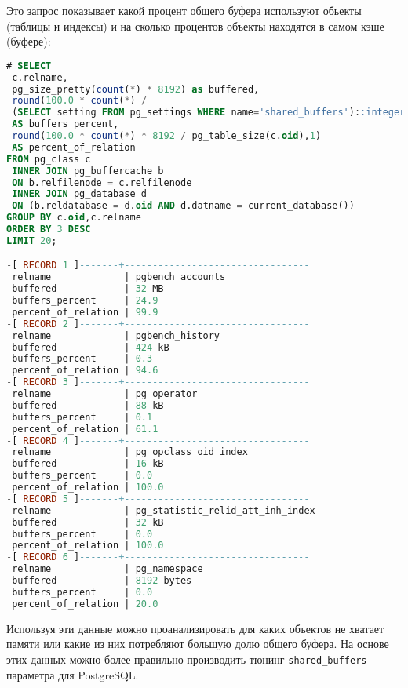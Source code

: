 Это запрос показывает какой процент общего буфера используют обьекты (таблицы и индексы) и на сколько процентов объекты находятся в самом кэше (буфере):

\begin{lstlisting}[language=SQL,label=lst:pgbuffercache4,caption=pg\_buffercache]
# SELECT
 c.relname,
 pg_size_pretty(count(*) * 8192) as buffered,
 round(100.0 * count(*) /
 (SELECT setting FROM pg_settings WHERE name='shared_buffers')::integer,1)
 AS buffers_percent,
 round(100.0 * count(*) * 8192 / pg_table_size(c.oid),1)
 AS percent_of_relation
FROM pg_class c
 INNER JOIN pg_buffercache b
 ON b.relfilenode = c.relfilenode
 INNER JOIN pg_database d
 ON (b.reldatabase = d.oid AND d.datname = current_database())
GROUP BY c.oid,c.relname
ORDER BY 3 DESC
LIMIT 20;

-[ RECORD 1 ]-------+---------------------------------
 relname             | pgbench_accounts
 buffered            | 32 MB
 buffers_percent     | 24.9
 percent_of_relation | 99.9
-[ RECORD 2 ]-------+---------------------------------
 relname             | pgbench_history
 buffered            | 424 kB
 buffers_percent     | 0.3
 percent_of_relation | 94.6
-[ RECORD 3 ]-------+---------------------------------
 relname             | pg_operator
 buffered            | 88 kB
 buffers_percent     | 0.1
 percent_of_relation | 61.1
-[ RECORD 4 ]-------+---------------------------------
 relname             | pg_opclass_oid_index
 buffered            | 16 kB
 buffers_percent     | 0.0
 percent_of_relation | 100.0
-[ RECORD 5 ]-------+---------------------------------
 relname             | pg_statistic_relid_att_inh_index
 buffered            | 32 kB
 buffers_percent     | 0.0
 percent_of_relation | 100.0
-[ RECORD 6 ]-------+---------------------------------
 relname             | pg_namespace
 buffered            | 8192 bytes
 buffers_percent     | 0.0
 percent_of_relation | 20.0
\end{lstlisting}

Используя эти данные можно проанализировать для каких объектов не хватает памяти или какие из них потребляют большую долю общего буфера. На основе этих данных можно более правильно производить тюнинг \lstinline!shared_buffers! параметра для PostgreSQL.